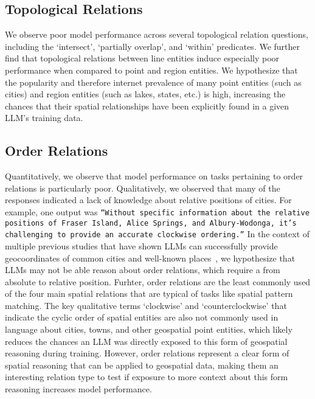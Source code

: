 \subsection{Topological Relations}
We observe poor model performance across several topological relation questions, including the `intersect', `partially overlap', and `within' predicates.
We further find that topological relations between line entities induce especially poor performance when compared to point and region entities.
We hypothesize that the popularity and therefore internet prevalence of many point entities (such as cities) and region entities (such as lakes, states, etc.) is high, increasing the chances that their spatial relationships have been explicitly found in a given LLM's training data.


\subsection{Order Relations}
Quantitatively, we observe that model performance on tasks pertaining to order relations is particularly poor.
Qualitatively, we observed that many of the responses indicated a lack of knowledge about relative positions of cities.
For example, one output was 
\texttt{``Without specific information about the relative positions of Fraser Island, Alice Springs, and Albury-Wodonga, it's challenging to provide an accurate clockwise ordering.''}
In the context of multiple previous studies that have shown LLMs can successfully provide geocoordinates of common cities and well-known places~\cite{Bhandari2023,Qi2023}, we hypothesize that LLMs may not be able reason about order relations, which require a from absolute to relative position. 
Furhter, order relations are the least commonly used of the four main spatial relations that are typical of tasks like spatial pattern matching.
The key qualitative terms `clockwise' and `counterclockwise' that indicate the cyclic order of spatial entities are also not commonly used in language about cities, towns, and other geospatial point entities, which likely reduces the chances an LLM was directly exposed to this form of geospatial reasoning during training.
However, order relations represent a clear form of spatial reasoning that can be applied to geospatial data, making them an interesting relation type to test if exposure to more context about this form reasoning increases model performance.


